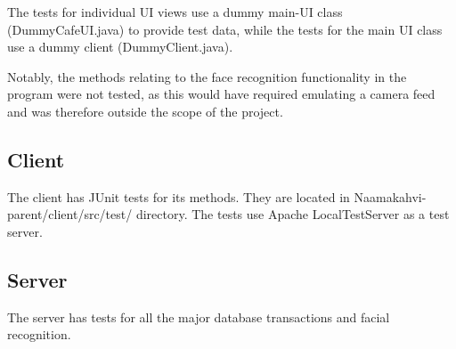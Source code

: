 \documentclass[11pt]{article}
\begin{document}
The tests for individual UI views use a dummy main-UI class (DummyCafeUI.java) to provide
test data, while the tests for the main UI class use a dummy client (DummyClient.java).

Notably, the methods relating to the face recognition functionality in the program were
not tested, as this would have required emulating a camera feed and was therefore outside
the scope of the project.

\subsection{Client}
The client has JUnit tests for its methods. They are located in Naamakahvi-parent/client/src/test/
directory. The tests use Apache LocalTestServer as a test server.

\subsection{Server}
The server has tests for all the major database transactions and facial recognition.
\end{document}
